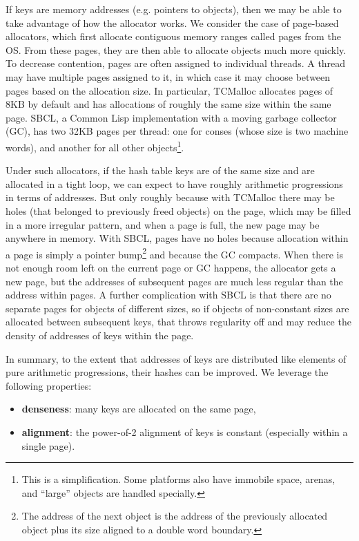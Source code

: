 \documentclass[sigconf]{acmart}
\begin{document}
If keys are memory addresses (e.g. pointers to objects), then we may be able to take advantage of how the allocator works.
We consider the case of page-based allocators, which first allocate contiguous memory ranges called pages from the OS.
From these pages, they are then able to allocate objects much more quickly.
To decrease contention, pages are often assigned to individual threads.
A thread may have multiple pages assigned to it, in which case it may choose between pages based on the allocation size.
In particular, TCMalloc allocates pages of 8KB by default and has allocations of roughly the same size within the same page.
SBCL, a Common Lisp implementation with a moving garbage collector (GC), has two 32KB pages per thread: one for conses (whose size is two machine words), and another for all other objects\footnote{This is a simplification. Some platforms also have immobile space, arenas, and ``large'' objects are handled specially.}.

Under such allocators, if the hash table keys are of the same size and are allocated in a tight loop, we can expect to have roughly arithmetic progressions in terms of addresses.
But only roughly because with TCMalloc there may be holes (that belonged to previously freed objects) on the page, which may be filled in a more irregular pattern, and when a page is full, the new page may be anywhere in memory.
With SBCL, pages have no holes because allocation within a page is simply a pointer bump\footnote{The address of the next object is the address of the previously allocated object plus its size aligned to a double word boundary.} and because the GC compacts.
When there is not enough room left on the current page or GC happens, the allocator gets a new page, but the addresses of subsequent pages are much less regular than the address within pages.
A further complication with SBCL is that there are no separate pages for objects of different sizes, so if objects of non-constant sizes are allocated between subsequent keys, that throws regularity off and may reduce the density of addresses of keys within the page.

In summary, to the extent that addresses of keys are distributed like elements of pure arithmetic progressions, their hashes can be improved.
We leverage the following properties:
\begin{itemize}
\item \textbf{denseness}: many keys are allocated on the same page,
\item \textbf{alignment}: the power-of-2 alignment of keys is constant (especially within a single page).
\end{itemize}
\end{document}
